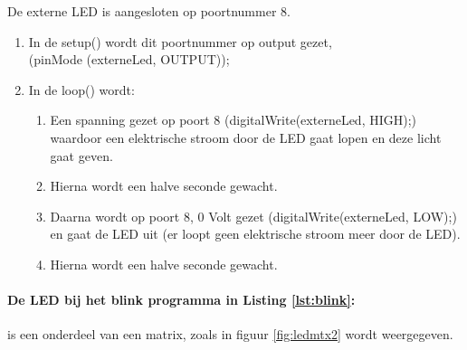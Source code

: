 De externe LED is aangesloten op poortnummer 8.
\begin{enumerate}
	\item In de \textcolor{arduinoGreen}{setup}() wordt dit poortnummer op output gezet,\\  (\textcolor{arduinoOrange}	{pinMode} (externeLed,  \textcolor{arduinoBlue}{OUTPUT})); 
\item In de \textcolor{arduinoGreen}{loop}() wordt:
\begin{enumerate}
	\item Een spanning gezet op poort 8 (\textcolor{arduinoOrange}{digitalWrite}(externeLed, \textcolor{arduinoBlue}{HIGH});) waardoor een elektrische stroom door de LED gaat lopen en deze licht gaat geven. 
	\item Hierna wordt een halve seconde gewacht.
	\item Daarna wordt op poort 8,  0 Volt gezet (\textcolor{arduinoOrange}{digitalWrite}(externeLed, \textcolor{arduinoBlue}{LOW});) en gaat de LED uit (er loopt geen elektrische stroom meer door de LED).
		\item Hierna wordt een halve seconde gewacht.
\end{enumerate} 
\end{enumerate}
 
\paragraph{De LED bij het blink programma in Listing \ref{lst:blink}:} is een onderdeel van een matrix, zoals in figuur \ref{fig:ledmtx2} wordt weergegeven.

